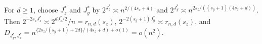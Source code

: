 For \(d\ge1\), choose \(J_z^*\) and \(J_y^*\) by \(2^{J_z^*}\asymp n^{2/(4s_z+d)}\) and \(2^{J_y^*}\asymp n^{2s_z/((s_y+1)(4s_z+d))}\). Then \(2^{-2s_zJ_z^*}\asymp2^{dJ_z^*/2}/n=r_{n,d}(s_z)\), \(2^{-2(s_y+1)J_y^*}\asymp r_{n,d}(s_z)\), and \(D_{J_y^*,J_z^*}=n^{\{2s_z/(s_y+1)+2d\}/(4s_z+d)+o(1)}=o(n^2)\).